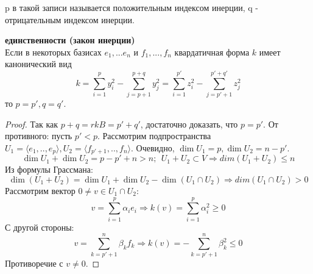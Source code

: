 \begin{definition}
    p в такой записи называется положительным индексом инерции, q - отрицательным индексом инерции.
\end{definition}
\begin{theorem} \textbf{единственности (закон инерции)} \\
    Если в некоторых базисах $e_1,...e_n$ и $f_1,...,f_n$ квардатичная форма $k$ имеет канонический вид 
    $$k = \sum \limits_{i=1}^p y_i^2 - \sum \limits_{j=p+1}^{p+q} y_j^2 = \sum \limits_{i=1}^{p'} z_i^2 - \sum \limits_{j=p'+1}^{p'+q'} z_j^2$$
    то $p = p', q = q'$.
\end{theorem} 
\begin{proof}
    Так как $p + q = rk B = p' + q'$, достаточно доказать, что $p = p'$.
    От противного: пусть $p' < p$. Рассмотрим подпространства $U_1 = \langle e_1,..,e_p \rangle, U_2 = \langle f_{p'+1},..,f_n \rangle$. Очевидно, $\dim U_1 = p, \dim U_2 = n- p'$.
    $$\dim U_1 + \dim U_2 = p - p' + n > n; \ \ U_1 + U_2 \subset V \Rightarrow dim(U_1 + U_2) \leq n$$
    Из формулы Грассмана:
    $$\dim (U_1 + U_2) = \dim U_1 + \dim U_2 - \dim (U_1 \cap U_2) \Rightarrow dim(U_1 \cap U_2) > 0$$
    Рассмотрим вектор $0 \neq v \in U_1 \cap U_2$:
    $$v = \sum \limits_{i=1}^{p} \alpha_i e_i \Rightarrow k(v) = \sum \limits_{i=1}^{p} \alpha_i^2 \geq 0$$
    С другой стороны:
    $$v = \sum \limits_{k=p'+1}^{n} \beta_k f_k \Rightarrow k(v) = -\sum \limits_{k=p'+1}^{n} \beta_k^2 \leq 0$$
    Противоречие с $v \neq 0$.
\end{proof}
